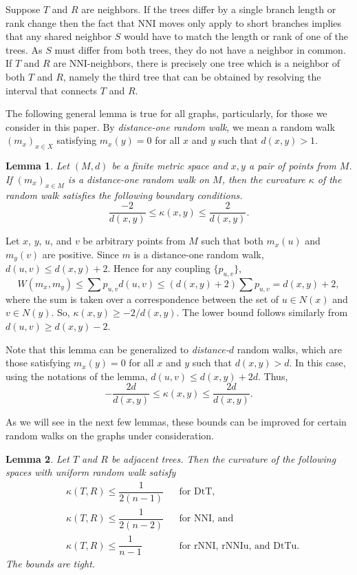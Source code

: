 \documentclass{amsart}
\newtheorem{lemma}{Lemma}
\theoremstyle{definition}
\newcommand{\nni}{\mathrm{NNI}}
\newcommand{\rnni}{\mathrm{rNNI}}
\newcommand{\rnniu}{\mathrm{rNNIu}}
\newcommand{\dtt}{\mathrm{DtT}}
\newcommand{\dttu}{\mathrm{DtTu}}
\begin{document}
{\proof
Suppose $T$ and $R$ are neighbors.
If the trees differ by a single branch length or rank change then the fact that NNI moves only apply to short branches implies that any shared neighbor $S$ would have to match the length or rank of one of the trees.
As $S$ must differ from both trees, they do not have a neighbor in common.
If $T$ and $R$ are NNI-neighbors, there is precisely one tree which is a neighbor of both $T$ and $R$, namely the third tree that can be obtained by resolving the interval that connects $T$ and $R$.
\endproof

The following general lemma is true for all graphs, particularly, for those we consider in this paper.
By \emph{distance-one random walk}, we mean a random walk $(m_x)_{x \in X}$ satisfying $m_x(y) = 0$ for all $x$ and $y$ such that $d(x,y) > 1$.

\begin{lemma}\label{curvBoundGeneral}
Let $(M,d)$ be a finite metric space and $x,y$ a pair of points from $M$.
If $(m_x)_{x \in M}$ is a distance-one random walk on $M$, then the curvature $\kappa$ of the random walk satisfies the following boundary conditions.
\[
\dfrac{-2}{d(x,y)} \leq \kappa(x,y) \leq \dfrac{2}{d(x,y)}.
\]
\end{lemma}

\proof
Let $x$, $y$, $u$, and $v$ be arbitrary points from $M$ such that both $m_x(u)$ and $m_y(v)$ are positive.
Since $m$ is a distance-one random walk, $d(u,v) \leq d(x,y) + 2$.
Hence for any coupling $\{p_{u,v}\}$,
\[
W(m_x,m_y) \leq \sum p_{u,v} d(u,v) \leq (d(x,y)+2)\sum p_{u,v} = d(x,y) + 2,
\]
where the sum is taken over a correspondence between the set of $u \in N(x)$ and $v \in N(y)$.
So, $\kappa(x,y) \geq - 2/d(x,y)$.
The lower bound follows similarly from $d(u,v) \geq d(x,y) - 2$.
\endproof

Note that this lemma can be generalized to \emph{distance-$d$} random walks, which are those satisfying $m_x(y) = 0$ for all $x$ and $y$ such that $d(x,y) > d$.
In this case, using the notations of the lemma, $d(u,v) \leq d(x,y) + 2d$.
Thus,
\[
-\dfrac{2d}{d(x,y)} \leq \kappa(x,y) \leq \dfrac{2d}{d(x,y)}.
\]

As we will see in the next few lemmas, these bounds can be improved for certain random walks on the graphs under consideration.

\begin{lemma}\label{uniformUpper}
Let $T$ and $R$ be adjacent trees.
Then the curvature of the following spaces with uniform random walk satisfy
\begin{align*}
& \kappa(T,R) \leq \dfrac{1}{2(n-1)}	&& \mbox{for $\dtt$,}\\
& \kappa(T,R) \leq \dfrac{1}{2(n-2)}	&& \mbox{for $\nni$, and}\\
& \kappa(T,R) \leq \dfrac{1}{n-1}	&& \mbox{for $\rnni$, $\rnniu$, and $\dttu$.}
\end{align*}
The bounds are tight.
\end{lemma}

}
\end{document}
